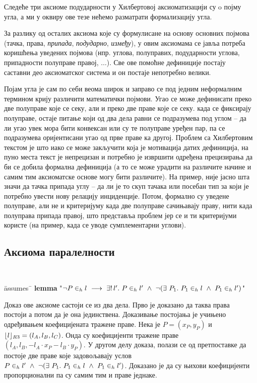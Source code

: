 Следеће три аксиоме подударности у Хилбертовој аксиоматизацији су o
појму угла, а ми у оквиру ове тезе нећемо разматрати формализацију
угла.

За разлику од осталих аксиома које су формулисане на основу основних
појмова (тачка, права, \emph{припада}, \emph{подударно},
\emph{између}), у овим аксиомама се јавља потреба коришћења уведених
појмова (нпр. углова, полуправих, подударности углова, припадности
полуправе правој, $\ldots$). Све ове помоћне дефиниције постају
саставни део аксиоматског система и он постаје непотребно велики.

Појам угла је сам по себи веома широк и заправо се под једним
неформалним термином крију различити математички појмови. Угао се може
дефинисати преко две полуправе које се секу, али и преко две праве
које се секу. када се фиксирају полуправе, остаје питање који од два
дела равни се подразумева под углом -- да ли угао увек мора бити
конвексан или су те полуправе уређен пар, па се подразумева
оријентисани угао од прве праве ка другој. Проблем са Хилбертовим
текстом је што иако се може закључити која је мотивација датих
дефиниција, на пуно места текст је непрецизан и потребно је извршити
одређена прецизирања да би се добила формална дефиниција (а то се може
урадити на различите начине и самим тим аксиоматске основе могу бити
различите). На пример, није јасно шта значи да тачка припада углу --
да ли је то скуп тачака или посебан тип за који је потребно увести
нову релацију инциденције. Потом, формално су уведене полуправе, али
не и критеријуму када две полуправе сачињавају праву, нити када
полуправа припада правој, што представља проблем јер се и ти
критеријуми користе (на пример, када се уводе сумплементарни углови).

\subsection{Аксиома паралелности}

{\tt
\begin{tabbing}
\hspace{5mm}\=assumes\ \=\kill
\textbf{lemma} "$\neg P \in_h l \ \longrightarrow\ \exists!\,l'.\ P \in_h l'\ \wedge\ \neg (\exists\ P_1.\ P_1 \in_h l\ \wedge\  P_1 \in_h l')$"
\end{tabbing}
}

Доказ ове аксиоме састоји се из два дела. Прво је доказано да таква
права постоји а потом да је она јединствена. Доказивање постојања је
учињено одређивањем коефицијената тражене праве. Нека је $P = (x_P,
y_P)$ и $\lfloor l\rfloor_{R3} = (l_A, l_B, l_C)$. Онда су коефицијенти тражене
праве $(l_A, l_B, -l_A\cdot x_P - l_B\cdot y_P)$. У другом делу
доказа, полази се од претпоставке да постоје две праве које
задовољавају услов $\inh{P}{l'}\ \wedge\ \neg
(\exists\ P_1.\ \inh{P_1}{l}\ \wedge\ \inh{P_1}{l'})$. Доказано је да
су њихови коефицијенти пропорционални па су самим тим и праве једнаке.

